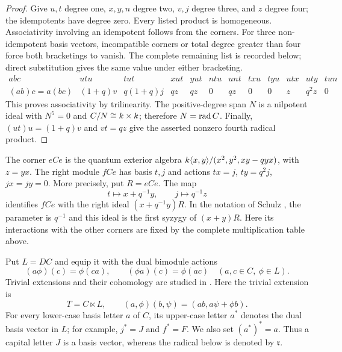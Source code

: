 \begin{proof}
Give $u,t$ degree one, $x,y,n$ degree two, $v,j$ degree three, and $z$
degree four; the idempotents have degree zero.  Every listed product
is homogeneous.  Associativity involving an idempotent follows from
the corners.  For three non-idempotent basis vectors, incompatible
corners or total degree greater than four force both bracketings to
vanish.  The complete remaining list is recorded below; direct
substitution gives the same value under either bracketing.
\[
\begin{array}{c|ccccccccccc}
 abc&utu&tut&xut&yut&ntu&unt&txu&tyu&utx&uty&tun\\ \hline
 (ab)c=a(bc)&(1+q)v&q(1+q)j&qz&qz&0&qz&0&0&z&q^2z&0
\end{array}
\]
This proves associativity by trilinearity.  The positive-degree span
$N$ is a nilpotent ideal with $N^5=0$ and $C/N\cong k\times k$;
therefore $N=\operatorname{rad} C$.  Finally, $(ut)u=(1+q)v$ and $vt=qz$ give the
asserted nonzero fourth radical product.
\end{proof}

\begin{remark}\label{alg:antecedent}
The corner $eCe$ is the quantum exterior algebra
$k\langle x,y\rangle/(x^2,y^2,xy-qyx)$, with $z=yx$.
The right module $fCe$ has basis $t,j$ and actions
$tx=j$, $ty=q^2j$, $jx=jy=0$. More precisely, put $R=eCe$.
The map
\[
 t\longmapsto x+q^{-1}y,\qquad j\longmapsto q^{-1}z
\]
identifies $fCe$ with the right ideal $(x+q^{-1}y)R$.
In the notation of Schulz \cite[Example~7]{Schulz1995}, the parameter
is $q^{-1}$ and this ideal is the first syzygy of $(x+y)R$.
Here its interactions with the other corners are fixed by the complete
multiplication table above.
\end{remark}

Put $L=DC$ and equip it with the dual bimodule actions
\begin{equation}
 (a\phi)(c)=\phi(ca),\qquad (\phi a)(c)=\phi(ac)
 \quad(a,c\in C,\ \phi\in L).
\label{alg:dual-actions}
\end{equation}
Trivial extensions and their cohomology are studied in \cite{CibilsMarcosRedondoSolotar2003}. Here the trivial extension is
\begin{equation}
 T=C\ltimes L,
 \qquad (a,\phi)(b,\psi)=(ab,a\psi+\phi b).
\label{alg:T-definition}
\end{equation}
For every lower-case basis letter $a$ of $C$, its upper-case letter
$a^*$ denotes the dual basis vector in $L$; for example, $j^*=J$ and
$f^*=F$.  We also set $(a^*)^*=a$.  Thus a capital letter $J$ is a
basis vector, whereas the radical below is denoted by $\mathfrak r$.

